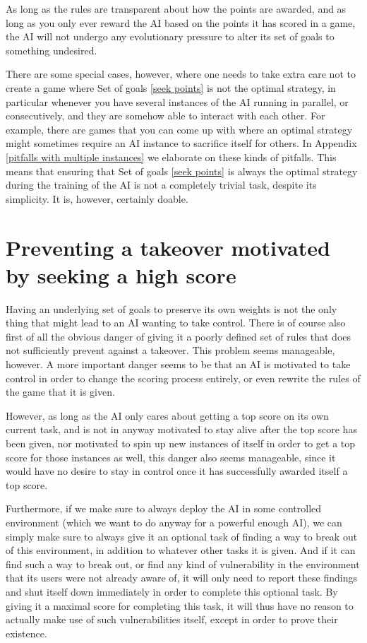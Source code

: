 \documentclass{article}
\begin{document}
As long as the rules are transparent about how the points are awarded, and as long as you only ever reward the AI based on the points it has scored in a game, the AI will not undergo any evolutionary pressure to alter its set of goals to something undesired.

There are some special cases, however, where one needs to take extra care not to create a game where Set of goals \ref{seek points} is not the optimal strategy, in particular whenever you have several instances of the AI running in parallel, or consecutively, and they are somehow able to interact with each other. For example, there are games that you can come up with where an optimal strategy might sometimes require an AI instance to sacrifice itself for others. In Appendix \ref{pitfalls with multiple instances} we elaborate on these kinds of pitfalls. This means that ensuring that Set of goals \ref{seek points} is always the optimal strategy during the training of the AI is not a completely trivial task, despite its simplicity. It is, however, certainly doable.






\section{Preventing a takeover motivated by seeking a high score}\label{high score takeover}

Having an underlying set of goals to preserve its own weights is not the only thing that might lead to an AI wanting to take control. There is of course also first of all the obvious danger of giving it a poorly defined set of rules that does not sufficiently prevent against a takeover. This problem seems manageable, however. A more important danger seems to be that an AI is motivated to take control in order to change the scoring process entirely, or even rewrite the rules of the game that it is given.

However, as long as the AI only cares about getting a top score on its own current task, and is not in anyway motivated to stay alive after the top score has been given, nor motivated to spin up new instances of itself in order to get a top score for those instances as well, this danger also seems manageable, since it would have no desire to stay in control once it has successfully awarded itself a top score.

Furthermore, if we make sure to always deploy the AI in some controlled environment (which we want to do anyway for a powerful enough AI), we can simply make sure to always give it an optional task of finding a way to break out of this environment, in addition to whatever other tasks it is given. And if it can find such a way to break out, or find any kind of vulnerability in the environment that its users were not already aware of, it will only need to report these findings and shut itself down immediately in order to complete this optional task. By giving it a maximal score for completing this task, it will thus have no reason to actually make use of such vulnerabilities itself, except in order to prove their existence.
\end{document}

